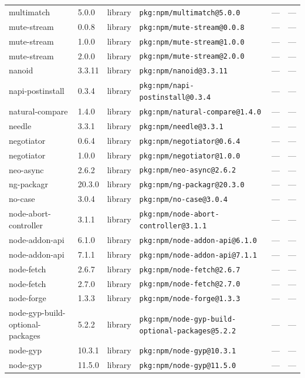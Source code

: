 \documentclass[11pt]{article}
\begin{document}
\begin{longtable}{|l|l|l|p{2.2cm}|l|p{4cm}|}
multimatch & 5.0.0 & library & \texttt{pkg:npm/multimatch@5.0.0} & — & — \\
mute-stream & 0.0.8 & library & \texttt{pkg:npm/mute-stream@0.0.8} & — & — \\
mute-stream & 1.0.0 & library & \texttt{pkg:npm/mute-stream@1.0.0} & — & — \\
mute-stream & 2.0.0 & library & \texttt{pkg:npm/mute-stream@2.0.0} & — & — \\
nanoid & 3.3.11 & library & \texttt{pkg:npm/nanoid@3.3.11} & — & — \\
napi-postinstall & 0.3.4 & library & \texttt{pkg:npm/napi-postinstall@0.3.4} & — & — \\
natural-compare & 1.4.0 & library & \texttt{pkg:npm/natural-compare@1.4.0} & — & — \\
needle & 3.3.1 & library & \texttt{pkg:npm/needle@3.3.1} & — & — \\
negotiator & 0.6.4 & library & \texttt{pkg:npm/negotiator@0.6.4} & — & — \\
negotiator & 1.0.0 & library & \texttt{pkg:npm/negotiator@1.0.0} & — & — \\
neo-async & 2.6.2 & library & \texttt{pkg:npm/neo-async@2.6.2} & — & — \\
ng-packagr & 20.3.0 & library & \texttt{pkg:npm/ng-packagr@20.3.0} & — & — \\
no-case & 3.0.4 & library & \texttt{pkg:npm/no-case@3.0.4} & — & — \\
node-abort-controller & 3.1.1 & library & \texttt{pkg:npm/node-abort-controller@3.1.1} & — & — \\
node-addon-api & 6.1.0 & library & \texttt{pkg:npm/node-addon-api@6.1.0} & — & — \\
node-addon-api & 7.1.1 & library & \texttt{pkg:npm/node-addon-api@7.1.1} & — & — \\
node-fetch & 2.6.7 & library & \texttt{pkg:npm/node-fetch@2.6.7} & — & — \\
node-fetch & 2.7.0 & library & \texttt{pkg:npm/node-fetch@2.7.0} & — & — \\
node-forge & 1.3.3 & library & \texttt{pkg:npm/node-forge@1.3.3} & — & — \\
node-gyp-build-optional-packages & 5.2.2 & library & \texttt{pkg:npm/node-gyp-build-optional-packages@5.2.2} & — & — \\
node-gyp & 10.3.1 & library & \texttt{pkg:npm/node-gyp@10.3.1} & — & — \\
node-gyp & 11.5.0 & library & \texttt{pkg:npm/node-gyp@11.5.0} & — & — \\

\end{longtable}
\end{document}
